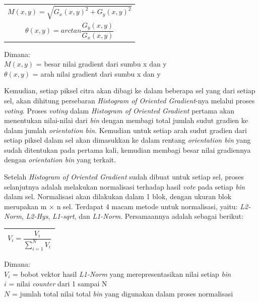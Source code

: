 \begin{table}[H]
	\small
	\begin{adjustbox}{width=1\textwidth}
		\begin{tabular}{|p{13.55cm}|}
			\hline
			\begin{equation} 
			M(x, y) = \sqrt{G_{x}(x,y)^2 + G_{y}(x,y)^2}
			\label{eq:PersamaanMagnitude}
			\end{equation}\\
			\begin{equation} 
			\theta(x, y) = arctan\frac{G_{y}(x,y)}{G_{x}(x,y)}
			\label{eq:PersamaanArah}
			\end{equation}\\
			\hline
		\end{tabular}
	\end{adjustbox}
\end{table}
\noindent Dimana:\\
$M(x,y)$ = besar nilai gradient dari sumbu x dan y\\
$\theta(x,y)$ = arah nilai gradient dari sumbu x dan y

\noindent Kemudian, setiap piksel citra akan dibagi ke dalam beberapa sel yang dari setiap sel, akan dihitung persebaran \textit{Histogram of Oriented Gradient}-nya melalui proses \textit{voting}. Proses \textit{voting} dalam \textit{Histogram of Oriented Gradient} pertama akan menentukan nilai-nilai dari \textit{bin} dengan membagi total jumlah sudut gradien ke dalam jumlah \textit{orientation bin}. Kemudian untuk setiap arah sudut gradien dari setiap piksel dalam sel akan dimasukkan ke dalam rentang \textit{orientation bin} yang sudah ditentukan pada pertama kali, kemudian membagi besar nilai gradiennya dengan \textit{orientation bin} yang terkait.

\noindent Setelah \textit{Histogram of Oriented Gradient} sudah dibuat untuk setiap sel, proses selanjutnya adalah melakukan normalisasi terhadap hasil \textit{vote} pada setiap \textit{bin} dalam sel. Normalisasi akan dilakukan dalam 1 blok, dengan ukuran blok merupakan m $\times$ n sel. Terdapat 4 macam metode untuk normalisasi, yaitu: \textit{L2-Norm}, \textit{L2-Hys}, \textit{L1-sqrt}, dan \textit{L1-Norm}. Persamaannya adalah sebagai berikut:

\begin{table}[H]
	\small
	\begin{adjustbox}{width=1\textwidth}
		\begin{tabular}{|p{13.55cm}|}
			\hline
			\begin{equation} 
			V_{i} = \frac{V_{i}}{\sum_{i=1}^{N}V_{i}}
			\end{equation}\\
			\hline
		\end{tabular}
	\end{adjustbox}
\end{table}
\noindent Dimana:\\
$V_{i}$ = bobot vektor hasil \textit{L1-Norm} yang merepresentasikan nilai setiap \textit{bin}\\
$i$ = nilai \textit{counter} dari 1 sampai N\\
$N$ = jumlah total nilai total \textit{bin} yang digunakan dalam proses normalisasi

